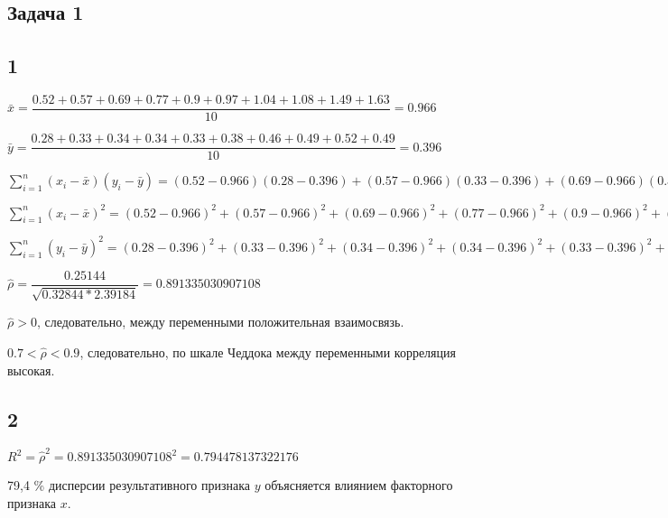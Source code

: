 \documentclass[12pt,a4paper, oneside]{extreport}
\begin{document}




\subsection*{Задача 1}

\subsection*{1}

$\bar{x} = \dfrac{0.52 + 0.57 + 0.69 + 0.77 + 0.9 + 0.97 + 1.04 + 1.08 + 1.49 + 1.63 }{10} = 0.966$

$\bar{y} = \dfrac{0.28 + 0.33 + 0.34 + 0.34 + 0.33 + 0.38 + 0.46 + 0.49 + 0.52 + 0.49  }{10} = 0.396$

$\sum_{i=1}^n (x_i-\bar{x})(y_i-\bar{y})= (0.52 -0.966)(  0.28 -0.396)+(  0.57 -0.966)(  0.33 -0.396)+(  0.69 -0.966)(  0.34 -0.396)+(  0.77 -0.966)(  0.34 -0.396)+(  0.9 -0.966)(  0.33 -0.396)+(  0.97 -0.966)(  0.38 -0.396)+(  1.04 -0.966)(  0.46 -0.396)+(  1.08 -0.966)(  0.49 -0.396)+(  1.49 -0.966)(  0.52 -0.396)+(  1.63 -0.966)(  0.49 -0.396) = 0.25144$


$\sum_{i=1}^n (x_i-\bar{x})^2 = (0.52 -0.966)^2+( 0.57 -0.966)^2+( 0.69 -0.966)^2+( 0.77 -0.966)^2+( 0.9 -0.966)^2+( 0.97 -0.966)^2+( 1.04 -0.966)^2+( 1.08 -0.966)^2+( 1.49 -0.966)^2+( 1.63 -0.966)^2 = 1.20864 $


$\sum_{i=1}^n (y_i-\bar{y})^2 = (0.28 -0.396)^2+( 0.33 -0.396)^2+( 0.34 -0.396)^2+( 0.34 -0.396)^2+( 0.33 -0.396)^2+( 0.38 -0.396)^2+( 0.46 -0.396)^2+( 0.49 -0.396)^2+( 0.52 -0.396)^2+( 0.49 -0.396)^2 = 0.06584$

$\hat{\rho} = \dfrac{0.25144}{\sqrt{ 0.32844 * 2.39184} } = 0.891335030907108$

$ \hat{\rho}  > 0   $, следовательно,  между переменными положительная взаимосвязь.  

$0.7 < \hat{\rho}  < 0.9  $, следовательно, по шкале Чеддока между переменными корреляция высокая.  

\subsection*{2}

$R^2 = \hat{\rho}^2 = 0.891335030907108^2= 0.794478137322176 $

79,4 \% дисперсии результативного признака $y$ объясняется влиянием факторного признака $x$.
\end{document}
